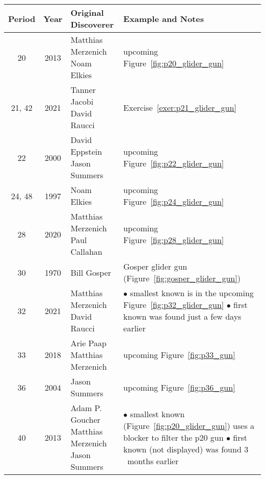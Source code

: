 \begin{table}[!htbp]\vspace*{0.02in}
	\begin{center}		
		\begin{tabular}{ccll}
			\toprule
			Period & Year & Original Discoverer & Example and Notes \\ \midrule
			20 & 2013 & \specialcelll[t]{Matthias Merzenich \\ Noam Elkies} & upcoming Figure~\ref{fig:p20_glider_gun} \\
			\rowcolor{gray!20} 21, 42 & 2021 & \specialcelll[t]{Tanner Jacobi \\ David Raucci} & Exercise~\ref{exer:p21_glider_gun} \\
			22 & 2000 & \specialcelll[t]{David Eppstein \\ Jason Summers} & upcoming Figure~\ref{fig:p22_glider_gun} \\
			\rowcolor{gray!20} 24, 48 & 1997 & Noam Elkies & upcoming Figure~\ref{fig:p24_glider_gun} \\
			28 & 2020 & \specialcelll[t]{Matthias Merzenich \\ Paul Callahan} & upcoming Figure~\ref{fig:p28_glider_gun} \\
			\rowcolor{gray!20} 30 & 1970 & Bill Gosper & Gosper glider gun (Figure~\ref{fig:gosper_glider_gun}) \\
			32 & 2021 & \specialcelll[t]{Matthias Merzenich \\ David Raucci} & \specialcelll[t]{{\small$\bullet$} smallest known is in the upcoming Figure~\ref{fig:p32_glider_gun} \\ {\small$\bullet$} first known was found just a few days earlier} \\
			\rowcolor{gray!20} 33 & 2018 & \specialcelll[t]{Arie Paap \\ Matthias Merzenich} & upcoming Figure~\ref{fig:p33_gun} \\
			36 & 2004 & Jason Summers & upcoming Figure~\ref{fig:p36_gun} \\
			\rowcolor{gray!20} 40 & 2013 & \specialcelll[t]{Adam P. Goucher \\ Matthias Merzenich \\ Jason Summers} & \specialcelll[t]{{\small$\bullet$} smallest known (Figure~\ref{fig:p20_glider_gun}) uses a blocker to \\ \hphantom{\small$\bullet$} filter the p$20$ gun \\ {\small$\bullet$} first known (not displayed) was found $3$~months earlier} \\

\end{tabular}
\end{center}
\end{table}
